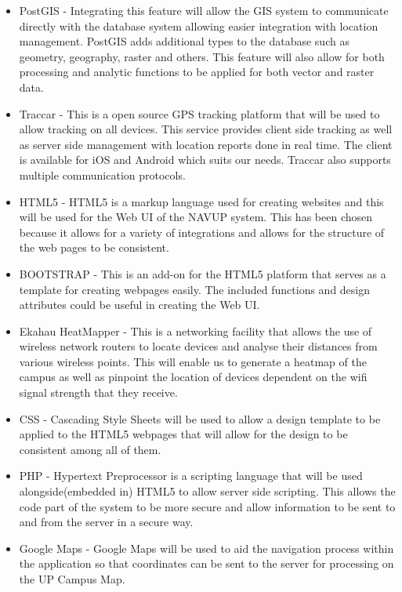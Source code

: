\documentclass{article}
\begin{document}
\begin{itemize}
\item PostGIS - Integrating this feature will allow the GIS system to communicate directly with the database system allowing easier integration with location management. PostGIS adds additional types to the database such as geometry, geography, raster and others. This feature will also allow for both processing and analytic functions to be applied for both vector and raster data.
\item Traccar - This is a open source GPS tracking platform that will be used to allow tracking on all devices. This service provides client side tracking as well as server side management with location reports done in real time. The client is available for iOS and Android which suits our needs. Traccar also supports multiple communication protocols. 
\item HTML5 - HTML5 is a markup language used for creating websites and this will be used for the Web UI of the NAVUP system. This has been chosen because it allows for a variety of integrations and allows for the structure of the web pages to be consistent. 
\item BOOTSTRAP - This is an add-on for the HTML5 platform that serves as a template for creating webpages easily. The included functions and design attributes could be useful in creating the Web UI.
\item Ekahau HeatMapper - This is a networking facility that allows the use of wireless network routers to locate devices and analyse their distances from various wireless points. This will enable us to generate a heatmap of the campus as well as pinpoint the location of devices dependent on the wifi signal strength that they receive.
\item CSS - Cascading Style Sheets will be used to allow a design template to be applied to the HTML5 webpages that will allow for the design to be consistent among all of them.
\item PHP - Hypertext Preprocessor is a scripting language that will be used alongside(embedded in) HTML5 to allow server side scripting. This allows the code part of the system to be more secure and allow information to be sent to and from the server in a secure way.
\item Google Maps - Google Maps will be used to aid the navigation process within the application so that coordinates can be sent to the server for processing on the UP Campus Map. 
\end{itemize}
\end{document}
